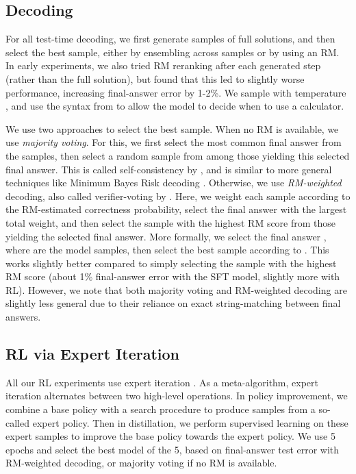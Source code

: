 \documentclass[11pt, a4paper, logo]{deepmind}
\begin{document}
\subsection{Decoding}
\label{subsec:decoding}

For all test-time decoding, we first generate  samples of full solutions, and then select the best sample, either by ensembling across samples or by using an RM.
In early experiments, we also tried RM reranking after each generated step (rather than the full solution), but found that this led to slightly worse performance, increasing final-answer error by 1-2\%. We sample with temperature , and use the syntax from \citet{cobbe2021training} to allow the model to decide when to use a calculator.

We use two approaches to select the best sample.
When no RM is available, we use \emph{majority voting}.
For this, we first select the most common final answer from the  samples, then select a random sample from among those yielding this selected final answer.
This is called self-consistency by \citet{wang2022self}, and is similar to more general techniques like Minimum Bayes Risk decoding \citep{kumar2004minimum}.
Otherwise, we use \emph{RM-weighted} decoding, also called verifier-voting by \citet{li2022advance}.
Here, we weight each sample according to the RM-estimated correctness probability, select the final answer with the largest total weight, and then select the sample with the highest RM score from those yielding the selected final answer.
More formally, we select the final answer , where  are the model samples,
then select the best sample according to .
This works slightly better compared to simply selecting the sample with the highest RM score (about 1\% final-answer error with the SFT model, slightly more with RL). However, we note that both majority voting and RM-weighted decoding are slightly less general due to their reliance on exact string-matching between final answers.

\subsection{RL via Expert Iteration} 
\label{subsec:rl}

All our RL experiments use expert iteration \citep{silver2017mastering, anthony2017thinking}.
As a meta-algorithm, expert iteration alternates between two high-level operations.
In policy improvement, we combine a base policy with a search procedure to produce samples from a so-called expert policy.
Then in distillation, we perform supervised learning on these expert samples to improve the base policy towards the expert policy.
We use 5 epochs and select the best model of the 5, based on final-answer test error with RM-weighted decoding, or majority voting if no RM is available.
\end{document}
